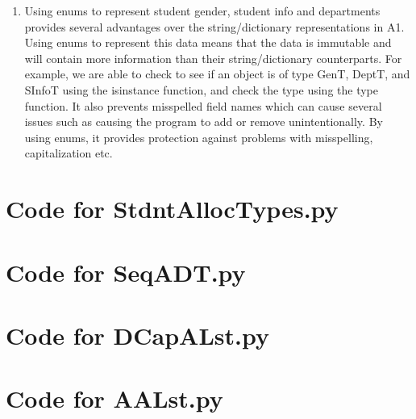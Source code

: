 \documentclass[12pt]{article}
\begin{document}
\begin{enumerate}
\item Using enums to represent student gender, student info and departments provides several advantages over the string/dictionary representations in A1. Using enums to represent this data means that the data is immutable and will contain more information than their string/dictionary counterparts. For example, we are able to check to see if an object is of type GenT, DeptT, and SInfoT using the isinstance function, and check the type using the type function. It also prevents misspelled field names which can cause several issues such as causing the program to add or remove unintentionally. By using enums, it provides protection against problems with misspelling, capitalization etc.

\end{enumerate}

\newpage

\lstset{language=Python, basicstyle=\tiny, breaklines=true, showspaces=false,
  showstringspaces=false, breakatwhitespace=true}

\def\thesection{\Alph{section}}

\section{Code for StdntAllocTypes.py}

\noindent 

\newpage

\section{Code for SeqADT.py}

\noindent 

\newpage

\section{Code for DCapALst.py}

\noindent 

\newpage

\section{Code for AALst.py}

\noindent 
\end{document}
